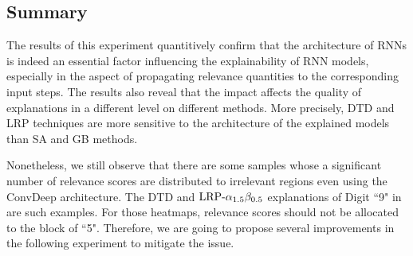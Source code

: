 
\subsection{Summary}
The results of this experiment quantitively confirm that the architecture of RNNs is indeed an essential factor influencing the explainability of RNN models, especially in the aspect of propagating relevance quantities to the corresponding input steps.  The results also reveal that the impact affects the quality of explanations in a different level on different  methods. More precisely, DTD and LRP techniques are more sensitive to the architecture of the explained models than SA and GB methods.

Nonetheless, we  still observe that there are some samples whose a significant number of relevance scores are distributed to irrelevant regions even using the ConvDeep architecture. The DTD and $\text{LRP-}\alpha_{1.5}\beta_{0.5}$ explanations of Digit ``9" in \addfigure{\ref{fig:heatmap_msc_mix_for_thesis}} are such examples. For those heatmaps, relevance scores should not be allocated to the block of ``5".   Therefore,  we are going to propose several improvements in the following experiment to mitigate the issue.

